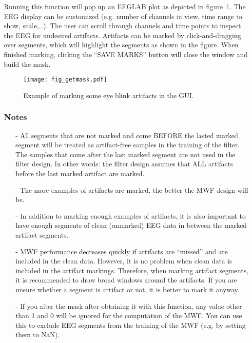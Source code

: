 \documentclass[11pt]{article}
\begin{document}
Running this function will pop up an EEGLAB plot as depicted in figure~\ref{fig:getmask}. The EEG display can be customized (e.g. number of channels in view, time range to show, scale,\ldots). The user can scroll through channels and time points to inspect the EEG for undesired artifacts. Artifacts can be marked by click-and-dragging over segments, which will highlight the segments as shown in the figure. When finished marking, clicking the ``SAVE MARKS'' button will close the window and build the mask.

\begin{figure}[h]
    \centering
    \texttt{[image: fig\_getmask.pdf]}
    \caption{Example of marking some eye blink artifacts in the GUI.}
    \label{fig:getmask}
\end{figure}

\newpage
\subsubsection{Notes}
\label{tips}

\begin{itemize}[noitemsep]
\item[-] All segments that are not marked and come BEFORE the lasted marked segment will be treated as artifact-free samples in the training of the filter. The samples that come after the last marked segment are not used in the filter design. In other words: the filter design assumes that ALL artifacts before the last marked artifact are marked.
\item[-] The more examples of artifacts are marked, the better the MWF design will be.
\item[-] In addition to marking enough examples of artifacts, it is also important to have enough segments of clean (unmarked) EEG data in between the marked artifact  segments.
\item[-] MWF performance decreases quickly if artifacts are ``missed'' and are included in the clean data. However, it is no problem when clean data is included in the artifact markings. Therefore, when marking artifact segments, it is recommended to draw broad windows around the artifacts. If you are unsure whether a segment is artifact or not, it is better to mark it anyway.
\item[-] If you alter the mask after obtaining it with this function, any value other than 1 and 0 will be ignored for the computation of the MWF. You can use this to exclude EEG segments from the training of the MWF (e.g. by setting them to NaN).
\end{itemize}
\vspace{10mm}
\end{document}
